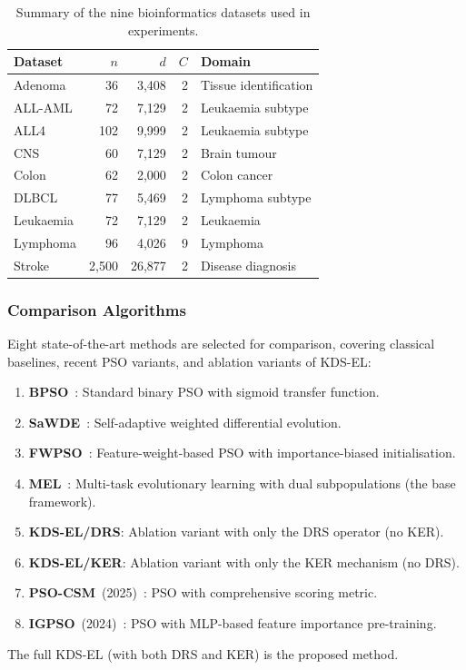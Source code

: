 \documentclass[a4paper,fleqn]{cas-dc}
\begin{document}
\begin{sloppypar}
	\begin{table}[t]
	\centering
	\caption{Summary of the nine bioinformatics datasets used in experiments.}
	\label{tab:datasets}
	\setlength{\tabcolsep}{4pt}
	\begin{tabular}{lrrrl}
	\toprule
	\textbf{Dataset} & \textbf{$n$} & \textbf{$d$} & \textbf{$C$} & \textbf{Domain} \\
	\midrule
	Adenoma     & 36   & 3,408  & 2 & Tissue identification \\
	ALL-AML     & 72   & 7,129  & 2 & Leukaemia subtype \\
	ALL4        & 102  & 9,999  & 2 & Leukaemia subtype \\
	CNS         & 60   & 7,129  & 2 & Brain tumour \\
	Colon       & 62   & 2,000  & 2 & Colon cancer \\
	DLBCL       & 77   & 5,469  & 2 & Lymphoma subtype \\
	Leukaemia   & 72   & 7,129  & 2 & Leukaemia \\
	Lymphoma    & 96   & 4,026  & 9 & Lymphoma \\
	Stroke      & 2,500 & 26,877 & 2 & Disease diagnosis \\
	\bottomrule
	\end{tabular}
	\end{table}


	\subsubsection{Comparison Algorithms}
	\label{sec:experiments:algorithms}

	\par{
	Eight state-of-the-art methods are selected for comparison,
	covering classical baselines, recent PSO variants, and ablation
	variants of KDS-EL:
	\begin{enumerate}
		\item \textbf{BPSO}~\citep{chuang2011binary}: Standard binary PSO
		with sigmoid transfer function.
		\item \textbf{SaWDE}~\citep{zhan2020sa}: Self-adaptive
		weighted differential evolution.
		\item \textbf{FWPSO}~\citep{huang2020enhanced}: Feature-weight-based
		PSO with importance-biased initialisation.
		\item \textbf{MEL}~\citep{MEL_CITE}: Multi-task evolutionary
		learning with dual subpopulations (the base framework).
		\item \textbf{KDS-EL/DRS}: Ablation variant with only the DRS
		operator (no KER).
		\item \textbf{KDS-EL/KER}: Ablation variant with only the KER
		mechanism (no DRS).
		\item \textbf{PSO-CSM}~(2025)~\citep{PSOCSM_CITE}: PSO with
		comprehensive scoring metric.
		\item \textbf{IGPSO}~(2024)~\citep{IGPSO_CITE}: PSO with
		MLP-based feature importance pre-training.
	\end{enumerate}
	The full KDS-EL (with both DRS and KER) is the proposed method.
	}



\end{sloppypar}
\end{document}
